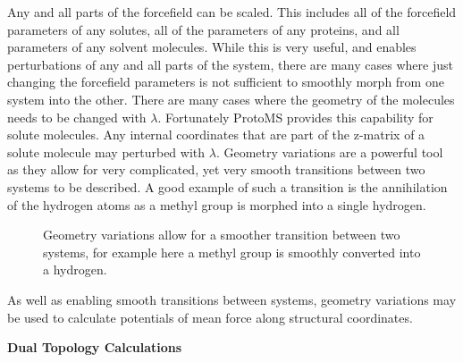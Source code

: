 \documentclass[letterpaper,10pt,english]{sphinxmanual}
\begin{document}
Any and all parts of the forcefield can be scaled. This includes all of the forcefield parameters of any solutes, all of the parameters of any proteins, and all parameters of any solvent molecules. While this is very useful, and enables perturbations of any and all parts of the system, there are many cases where just changing the forcefield parameters is not sufficient to smoothly morph from one system into the other. There are many cases where the geometry of the molecules needs to be changed with \(\lambda\). Fortunately ProtoMS provides this capability for solute molecules. Any internal coordinates that are part of the z-matrix of a solute molecule may perturbed with \(\lambda\). Geometry variations are a powerful tool as they allow for very complicated, yet very smooth transitions between two systems to be described. A good example of such a transition is the annihilation of the hydrogen atoms as a methyl group is morphed into a single hydrogen.
\begin{figure}[htbp]
\centering
\capstart

\caption{Geometry variations allow for a smoother transition between two systems, for example here a methyl group is smoothly converted into a hydrogen.}\end{figure}

As well as enabling smooth transitions between systems, geometry variations may be used to calculate potentials of mean force along structural coordinates.

\textbf{Dual Topology Calculations}
\end{document}
